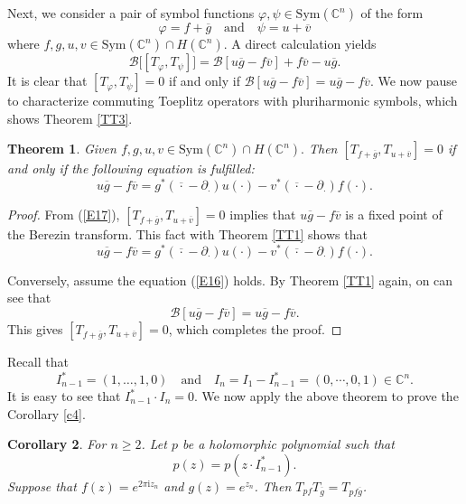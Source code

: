 \documentclass[11pt,reqno]{amsart}
\newtheorem{theorem}{Theorem}
\newtheorem{cor}[theorem]{Corollary}
\theoremstyle{definition}
\begin{document}
Next, we consider a pair of symbol functions $\varphi,\psi\in \mathrm{Sym}(\mathbb{C}^n)$ of the form
$$\varphi=f+\overline{g}\quad\text{and}\quad \psi=u+\overline{v}$$
where $f,g,u,v\in \mathrm{Sym}(\mathbb{C}^n)\cap H(\mathbb{C}^n).$
A direct calculation yields
\begin{equation}\label{E17}
\mathcal{B}\bigg[[T_\varphi,T_\psi]\bigg]=\mathcal{B}[u\overline{g}-f\overline{v}]+
f\overline{v}-u\overline{g}.
\end{equation}
It is clear that $[T_\varphi,T_\psi]=0$ if and only if $\mathcal{B}[u\overline{g}-f\overline{v}]=u\overline{g}-f\overline{v}.$ We now pause to characterize commuting Toeplitz operators with pluriharmonic symbols, which shows Theorem \ref{TT3}.
\begin{theorem}\label{t3}
Given $f,g,u,v\in \text{Sym}(\mathbb{C}^n)\cap H(\mathbb{C}^n).$ Then $[T_{f+\overline{g}},T_{u+\overline{v}}]=0$ if and only if the following equation  is fulfilled:
\begin{equation*}
u\overline{g}-f\overline{v}=g^*({\overline{\cdot}}-\partial_\cdot) u(\cdot)-v^*({\overline{\cdot}}-\partial_\cdot) f(\cdot).
\end{equation*}
\end{theorem}
\begin{proof}
From (\ref{E17}), $[T_{f+\overline{g}},T_{u+\overline{v}}]=0$ implies that $u\overline{g}-f\overline{v}$ is a fixed point of the Berezin transform. This fact with Theorem \ref{TT1} shows that
$$u\overline{g}-f\overline{v}=g^*({\overline{\cdot}}-\partial_\cdot) u(\cdot)-v^*({\overline{\cdot}}-\partial_\cdot) f(\cdot).$$

Conversely, assume the equation (\ref{E16}) holds. By Theorem \ref{TT1} again, on can see that
$$\mathcal{B}[u\overline{g}-f\overline{v}]=u\overline{g}-f\overline{v}.$$ This gives
$[T_{f+\overline{g}},T_{u+\overline{v}}]=0$, which completes the proof.
\end{proof}
Recall that $$I_{n-1}^*=(1,\ldots,1,0)\quad\text{and}\quad I_n=I_1-I_{n-1}^*=(0,\cdots,0,1)\in \mathbb{C}^n.$$ It is easy to see that $I^*_{n-1}\cdot I_n=0.$ We now apply the above theorem to  prove the Corollary \ref{c4}.
\begin{cor}
For $n\geq2$. Let $p$ be a holomorphic polynomial  such that $$p(z)=p(z\cdot I_{n-1}^*).$$ Suppose that $f(z)=e^{2\pi \mathrm{i}z_n}$ and $g(z)=e^{z_n}$. Then $T_{pf}T_{\overline{g}}=T_{pf\overline{g}}$.
\end{cor}
\end{document}
